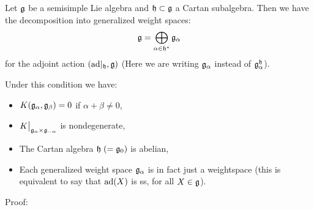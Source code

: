 \begin{dang}
    \begin{lemma}
        Let $\mathfrak{g}$ be a semisimple Lie algebra and $\mathfrak{h}\subset \mathfrak{g}$ a Cartan subalgebra. Then we have the decomposition 
        into generalized weight spaces:
        \begin{equation}
            \mathfrak{g}=\bigoplus_{\alpha\in\mathfrak{h}^*}\mathfrak{g}_\alpha
        \end{equation}
        for the adjoint action $(\text{ad}|_{\mathfrak{h}},\mathfrak{g})$
        (Here we are writing $\mathfrak{g}_\alpha$ instead of $\mathfrak{g}_\alpha^{\mathfrak{h}}$).
        \par

        Under this condition we have:
        \begin{itemize}
            \item[1.] $K(\mathfrak{g}_\alpha,\mathfrak{g}_\beta)=0$ if $\alpha+\beta\neq0$,
            \item[2.] $K\big|_{\mathfrak{g}_\alpha\times\mathfrak{g}_{-\alpha}}$ is nondegenerate,
            \item[3.] The Cartan algebra $\mathfrak{h}\;(=\mathfrak{g}_0)$ is abelian, 
            \item[4.] Each generalized weight space $\mathfrak{g}_\alpha$ is in fact just a weightspace 
            (this is equivalent to say that $\text{ad}(X)$ is ss, for all $X\in\mathfrak{g}$).
        \end{itemize}
    \end{lemma}
\end{dang}
Proof: 

